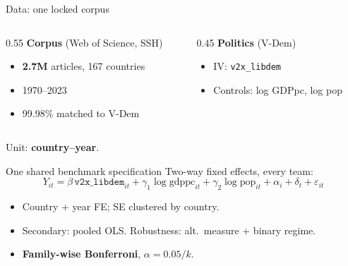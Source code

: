 \documentclass[aspectratio=169,11pt]{beamer}
\newcommand{\key}[1]{\textcolor{agentblue}{\textbf{#1}}}
\begin{document}
\begin{frame}{Data: one locked corpus}
  \begin{columns}[T]
    \begin{column}{0.55\textwidth}
      \textbf{Corpus} (Web of Science, SSH)
      \begin{itemize}
        \item \key{2.7M} articles, 167 countries
        \item 1970--2023
        \item 99.98\% matched to V-Dem
      \end{itemize}
    \end{column}
    \begin{column}{0.45\textwidth}
      \textbf{Politics} (V-Dem)
      \begin{itemize}
        \item IV: \texttt{v2x\_libdem}
        \item Controls: log GDPpc, log pop
      \end{itemize}
    \end{column}
  \end{columns}
  \vspace{0.8em}
  \centering Unit: \key{country--year}.
\end{frame}

\begin{frame}{One shared benchmark specification}
  Two-way fixed effects, every team:
  \begin{equation*}
    Y_{it} = \beta\,\texttt{v2x\_libdem}_{it}
      + \gamma_1 \log\text{gdppc}_{it}
      + \gamma_2 \log\text{pop}_{it}
      + \alpha_i + \delta_t + \varepsilon_{it}
  \end{equation*}
  \begin{itemize}
    \item Country + year FE; SE clustered by country.
    \item Secondary: pooled OLS. Robustness: alt.\ measure + binary regime.
    \item \key{Family-wise Bonferroni}, $\alpha = 0.05/k$.
  \end{itemize}
\end{frame}
\end{document}
